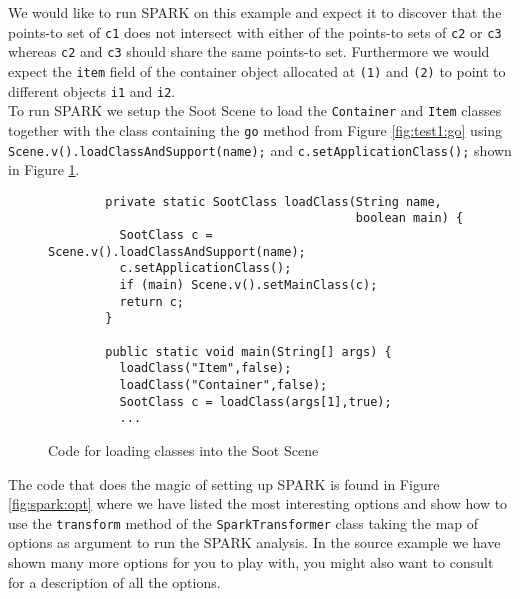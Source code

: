 \documentclass{article}
\newcommand{\code}[1]{\texttt{\small #1}}
\begin{document}
We would like to run SPARK on this example and expect it to discover
that the points-to set of \code{c1} does not intersect with either of
the points-to sets of \code{c2} or \code{c3} whereas \code{c2} and
\code{c3} should share the same points-to set. Furthermore we would
expect the \code{item} field of the container object allocated at
\code{(1)} and \code{(2)} to point to different objects \code{i1} and
\code{i2}.\\

To run SPARK we setup the Soot Scene to load the
\code{Container} and \code{Item} classes together with the class
containing the \code{go} method from Figure \ref{fig:test1:go} using
\code{Scene.v().loadClassAndSupport(name);} and
\code{c.setApplicationClass();} shown in Figure
\ref{fig:soot:loadclass}.

\begin{figure}[!htb]
  \centering
  \begin{verbatim}
        private static SootClass loadClass(String name,
                                           boolean main) {
          SootClass c = Scene.v().loadClassAndSupport(name);
          c.setApplicationClass();
          if (main) Scene.v().setMainClass(c);
          return c;
        }
        
        public static void main(String[] args) {
          loadClass("Item",false);
          loadClass("Container",false);
          SootClass c = loadClass(args[1],true);
          ...
  \end{verbatim}
  \caption{Code for loading classes into the Soot Scene}
  \label{fig:soot:loadclass}
\end{figure}

The code that does the magic of setting up SPARK is found in Figure
\ref{fig:spark:opt} where we have listed the most interesting options
and show how to use the \code{transform} method of the
\code{SparkTransformer} class taking the map of options as argument to
run the SPARK analysis. In the source example we have shown many more
options for you to play with, you might also want to consult
\cite{lhotak-msc} for a description of all the options.
\end{document}
